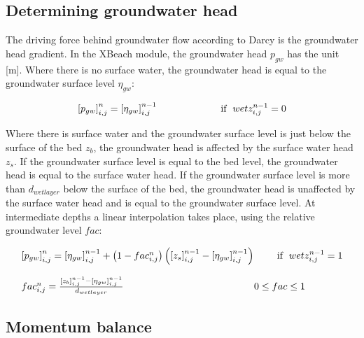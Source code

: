 \subsection{ Determining groundwater head}

The driving force behind groundwater flow according to Darcy is the groundwater head gradient. In the XBeach module, the groundwater head $p_{gw} $ has the unit [m]. Where there is no surface water, the groundwater head is equal to the groundwater surface level $\eta _{gw} $:

\begin{equation} \label{2.81)} 
\left[p_{gw} \right]_{i,j}^{n} =\left[\eta _{gw} \right]_{i,j}^{n-1} {\rm \; \; \; \; \; \; \; \; \; \; \; \; \; \; \; \; \; \; \; \; \; \; \; if\; \; }wetz_{i,j}^{n-1} =0 
\end{equation} 

Where there is surface water and the groundwater surface level is just below the surface of the bed $z_{b} $, the groundwater head is affected by the surface water head $z_{s} $. If the groundwater surface level is equal to the bed level, the groundwater head is equal to the surface water head. If the groundwater surface level is more than $d_{wetlayer} $ below the surface of the bed, the groundwater head is unaffected by the surface water head and is equal to the groundwater surface level. At intermediate depths a linear interpolation takes place, using the relative groundwater level $fac$:

\begin{equation} \label{2.82)} 
\begin{array}{l} {\left[p_{gw} \right]_{i,j}^{n} =\left[\eta _{gw} \right]_{i,j}^{n-1} +\left(1-fac_{i,j}^{n} \right)\left(\left[z_{s} \right]_{i,j}^{n-1} -\left[\eta _{gw} \right]_{i,j}^{n-1} \right){\rm \; \; \; \; \; \; \; \; if\; \; }wetz_{i,j}^{n-1} =1} \\ {{\rm \; \; \; \; \; \; \; \; \; \; \; \; \; \; }} \\ {fac_{i,j}^{n} =\frac{\left[z_{b} \right]_{i,j}^{n-1} -\left[\eta _{gw} \right]_{i,j}^{n-1} }{d_{wetlayer} } {\rm \; \; \; \; \; \; \; \; \; \; \; \; \; \; \; \; \; \; \; \; \; \; \; \; \; \; \; \; \; \; \; \; \; \; \; \; \; \; \; \; \; \; \; \; \; \; \; \; }0\le fac\le 1} \end{array} 
\end{equation} 

\subsection{ Momentum balance}

